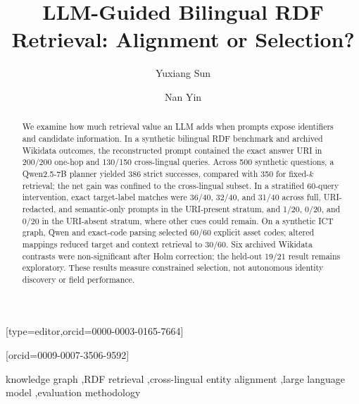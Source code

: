 \documentclass[a4paper,fleqn]{cas-dc}
\begin{document}
\let\WriteBookmarks\relax
\def\floatpagepagefraction{1}
\def\textpagefraction{.001}
\title[mode = title]{LLM-Guided Bilingual RDF Retrieval: Alignment or Selection?}

\author[1]{Yuxiang Sun}[type=editor,orcid=0000-0003-0165-7664]
\author[2]{Nan Yin}[orcid=0009-0007-3506-9592]

\begin{abstract}
We examine how much retrieval value an LLM adds when prompts expose identifiers and candidate information. In a synthetic bilingual RDF benchmark and archived Wikidata outcomes, the reconstructed prompt contained the exact answer URI in 200/200 one-hop and 130/150 cross-lingual queries. Across 500 synthetic questions, a Qwen2.5-7B planner yielded 386 strict successes, compared with 350 for fixed-$k$ retrieval; the net gain was confined to the cross-lingual subset. In a stratified 60-query intervention, exact target-label matches were 36/40, 32/40, and 31/40 across full, URI-redacted, and semantic-only prompts in the URI-present stratum, and 1/20, 0/20, and 0/20 in the URI-absent stratum, where other cues could remain. On a synthetic ICT graph, Qwen and exact-code parsing selected 60/60 explicit asset codes; altered mappings reduced target and context retrieval to 30/60. Six archived Wikidata contrasts were non-significant after Holm correction; the held-out 19/21 result remains exploratory. These results measure constrained selection, not autonomous identity discovery or field performance.\end{abstract}

\begin{keywords}
knowledge graph \sep RDF retrieval \sep cross-lingual entity alignment \sep large language model \sep evaluation methodology
\end{keywords}
\maketitle
{}
\end{document}
